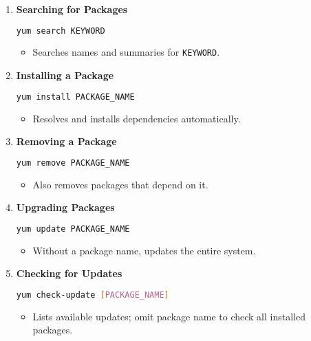 \documentclass[a4paper]{report}
\begin{document}
\begin{enumerate}
    \item \textbf{Searching for Packages}
    \begin{lstlisting}[language=bash]
yum search KEYWORD
    \end{lstlisting}
    \begin{itemize}
        \item Searches names and summaries for \texttt{KEYWORD}.
    \end{itemize}

    \item \textbf{Installing a Package}
    \begin{lstlisting}[language=bash]
yum install PACKAGE_NAME
    \end{lstlisting}
    \begin{itemize}
        \item Resolves and installs dependencies automatically.
    \end{itemize}

    \item \textbf{Removing a Package}
    \begin{lstlisting}[language=bash]
yum remove PACKAGE_NAME
    \end{lstlisting}
    \begin{itemize}
        \item Also removes packages that depend on it.
    \end{itemize}

    \item \textbf{Upgrading Packages}
    \begin{lstlisting}[language=bash]
yum update PACKAGE_NAME
    \end{lstlisting}
    \begin{itemize}
        \item Without a package name, updates the entire system.
    \end{itemize}

    \item \textbf{Checking for Updates}
    \begin{lstlisting}[language=bash]
yum check-update [PACKAGE_NAME]
    \end{lstlisting}
    \begin{itemize}
        \item Lists available updates; omit package name to check all installed packages.
    \end{itemize}


\end{enumerate}
\end{document}

